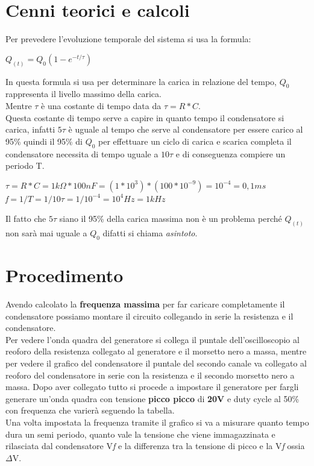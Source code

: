 \documentclass{article}
\begin{document}
    
    \vspace{1\baselineskip}
    \section{Cenni teorici e calcoli}
    Per prevedere l'evoluzione temporale del sistema si usa la formula:
    \begin{center}
        $Q_{(t)}=Q_{0}(1-e^{-t/\tau})$ \\
    \end{center}
    \noindent In questa formula si usa per determinare la carica in relazione del tempo, $Q_0$ rappresenta il livello massimo della carica. \\
    Mentre $\tau$ è una costante di tempo  data da $\tau=R*C$. 
    \\Questa costante di tempo serve a capire in quanto tempo il condensatore si carica, infatti $5\tau$ è uguale al tempo che serve al condensatore per essere carico al 95\% quindi il 95\% di $Q_0$ per effettuare un ciclo di carica e scarica completa il condensatore necessita di tempo uguale a $10\tau$ e di conseguenza compiere un periodo T. \\
    \begin{center}
        $\tau=R*C=1k\Omega*100nF=(1*10^3)*(100*10^{-9})=10^{-4}=0,1ms$\\
        \textit{f}$=1/T=1/10\tau=1/10^{-4}=10^4Hz=1kHz$\\
    \end{center}
    Il fatto che $5\tau$ siano il 95\% della carica massima non è un problema perché $Q_{(t)}$ non sarà mai uguale a $Q_0$ difatti si chiama \emph{asintoto}.\\
   
    \vspace{1\baselineskip}
    \section{Procedimento}
    Avendo calcolato la \textbf{frequenza massima} per far caricare completamente il condensatore possiamo montare il circuito collegando in serie la resistenza e il condensatore.\\ 
    Per vedere l'onda quadra del generatore si collega il puntale dell'oscilloscopio al reoforo della resistenza  collegato al generatore e il morsetto nero a massa, mentre per vedere il grafico del condensatore il puntale del secondo canale va collegato al reoforo del condensatore in serie con la resistenza e il secondo morsetto nero a massa.
    Dopo aver collegato tutto si procede a impostare il generatore per fargli generare un'onda quadra con tensione \textbf{picco picco} di \textbf{20V} e duty cycle al 50\% con frequenza che varierà seguendo la tabella.\\
    Una volta impostata la frequenza tramite il grafico si va a misurare quanto tempo dura un semi periodo, quanto vale la tensione che viene immagazzinata e rilasciata dal condensatore V\textit{f} e la differenza tra la tensione di picco e la V\textit{f} ossia $\Delta$V.
    
\end{document}
